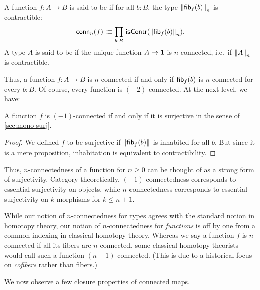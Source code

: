 \begin{defn}
A function $f:A\to B$ is said to be 
%
%
if for all $b:B$, the type $\trunc n{\hfiber f b}$ is contractible:
\begin{equation*}
  \mathsf{conn}_n(f)\defeq \prd{b:B}\iscontr(\trunc n{\hfiber{f}b}). 
\end{equation*}
A type $A$ is said to be 
%
%
 if the unique function $A\to\unit$ is $n$-connected, i.e.\ if $\trunc nA$ is contractible.
\end{defn}

Thus, a function $f:A\to B$ is $n$-connected if and only if $\hfib{f}b$ is $n$-connected for every $b:B$.
Of course, every function is $(-2)$-connected.
At the next level, we have:

\begin{lem}\label{thm:minusoneconn-surjective}
  A function $f$ is $(-1)$-connected if and only if it is surjective in the sense of \autoref{sec:mono-surj}.
\end{lem}
\begin{proof}
  We defined $f$ to be surjective if $\brck{\hfiber f b}$ is inhabited for all $b$.
  But since it is a mere proposition, inhabitation is equivalent to contractibility.
\end{proof}

Thus, $n$-connectedness of a function for $n\ge 0$ can be thought of as a strong form of surjectivity.
Category-theoretically, $(-1)$-connectedness corresponds to essential surjectivity on objects, while $n$-connectedness corresponds to essential surjectivity on $k$-morphisms for $k\le n+1$.

\begin{rmk}\label{rmk:connectedness-indexing}
  While our notion of $n$-connectedness for types agrees with the standard notion in homotopy theory, our notion of $n$-connectedness for \emph{functions} is off by one from a common indexing in classical homotopy theory.
  Whereas we say a function $f$ is $n$-connected if all its fibers are $n$-connected, some classical homotopy theorists would call such a function $(n+1)$-connected.
  (This is due to a historical focus on \emph{cofibers} rather than fibers.)
\end{rmk}

We now observe a few closure properties of connected maps.


